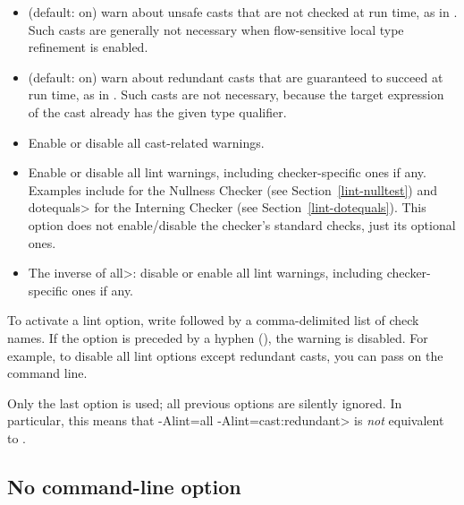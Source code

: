 \begin{itemize}

\item
   (default: on) warn about unsafe casts that are not
  checked at run time, as in .  Such casts
  are generally not necessary when flow-sensitive local type refinement is
  enabled.

\item
   (default: on) warn about redundant
  casts that are guaranteed to succeed at run time,
  as in .  Such casts are not necessary,
  because the target expression of the cast already has the given type
  qualifier.

\item
   Enable or disable all cast-related warnings.

\item
   Enable or disable all lint warnings, including
  checker-specific ones if any.  Examples include  for the
  Nullness Checker (see Section~\ref{lint-nulltest}) and \<dotequals> for
  the Interning Checker (see Section~\ref{lint-dotequals}).  This option
  does not enable/disable the checker's standard checks, just its optional
  ones.

\item
   The inverse of \<all>:  disable or enable all lint warnings,
  including checker-specific ones if any.

\end{itemize}


\noindent
To activate a lint option, write  followed by a
comma-delimited list of check names.  If the option is preceded by a
hyphen (\code{-}), the warning is disabled.  For example, to disable all
lint options except redundant casts, you can pass
 on the command line.

Only the last  option is used; all previous 
options are silently ignored.  In particular, this means that \<-Alint=all
-Alint=cast:redundant> is \emph{not} equivalent to
.


\subsection{No  command-line option\label{no-processor}}

